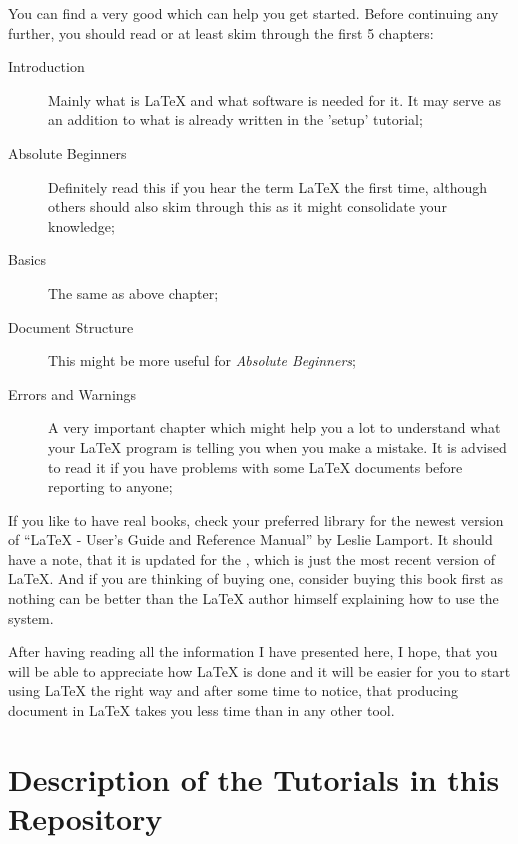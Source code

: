 \documentclass[
    draft
    ]{scrartcl}
\begin{document}
%
You can find a very good
    which can help you get started. 
%
Before continuing any further, you should read or at least skim through the
    first 5 chapters:
%
\begin{description}
    \item[Introduction] Mainly what is \LaTeX{} and what software is needed for
        it. It may serve as an addition to what is already written in the
        'setup' tutorial;
    \item[Absolute Beginners] Definitely read this if you hear the term \LaTeX{} the first
        time, although others should also skim through this as it might
        consolidate your knowledge;
    \item[Basics] The same as above chapter;
    \item[Document Structure] This might be more useful for \emph{Absolute
        Beginners};
    \item[Errors and Warnings] A very important chapter which might help you a
        lot to understand what your \LaTeX{} program is telling you when you
        make a mistake. It is advised to read it if you have problems with some
        \LaTeX{} documents before reporting to anyone;
\end{description}
%
If you like to have real books, check your preferred library for the newest
    version of ``\LaTeX{} - User's Guide and Reference Manual'' by Leslie
    Lamport.
%
It should have a note, that it is updated for the \LaTeXe{}, which is just the
    most recent version of \LaTeX{}.
%
And if you are thinking of buying one, consider buying this book first as
    nothing can be better than the \LaTeX{} author himself explaining how to use
    the system.

%
After having reading all the information I have presented here, I hope, that you
    will be able to appreciate how \LaTeX{} is done and it will be easier for you
    to start using \LaTeX{} the right way and after some time to notice, that
    producing document in \LaTeX{} takes you less time than in any other tool.

\section{Description of the Tutorials in this Repository}
\end{document}
